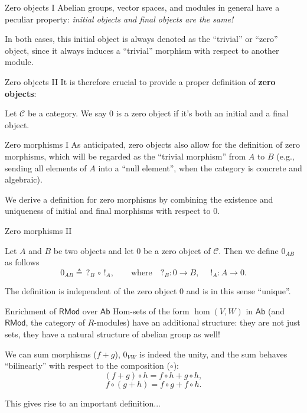 \documentclass{beamer}
\newcommand{\cat}[1]{\mathsf{#1}}
\begin{document}
\begin{frame}{Zero objects I}
    Abelian groups, vector spaces, and modules in general have a peculiar property: \textit{initial objects and
    final objects are the same!} \medskip
    
    In both cases, this initial object is always
    denoted as the ``trivial'' or ``zero'' object, since it always induces a
    ``trivial'' morphism with respect to another module.
\end{frame}

\begin{frame}{Zero objects II}
    It is therefore crucial to provide a proper definition of \textbf{zero objects}: \medskip
    
    \begin{definition}
        Let $\mathcal{C}$ be a category. We say $0$ is a
        zero object if it's both an initial and
        a final object.
    \end{definition}
\end{frame}

\begin{frame}{Zero morphisms I}
    As anticipated, zero objects also allow for the
    definition of zero morphisms, which will be regarded as the
    ``trivial morphism'' from $A$ to $B$ (e.g., sending all elements
    of $A$ into a ``null element'', when the category is concrete and
    algebraic). \medskip

    We derive a definition for zero morphisms
    by combining the existence and uniqueness of initial and final morphisms
    with respect to $0$.
\end{frame}

\begin{frame}{Zero morphisms II}
    \begin{definition}
        Let $A$ and $B$ be two objects and let $0$ be a zero
        object of $\mathcal{C}$. Then we define $0_{AB}$ as
        follows
        \[
            0_{AB} \triangleq \, ?_{B} \, \circ \, !_{A}, \qquad \text{where} \quad ?_B : 0 \to B, \quad\; !_A : A \to 0.
        \]
    \end{definition}

    The definition is independent of the zero object $0$ and is
    in this sense ``unique''.
\end{frame}

\begin{frame}{Enrichment of \texorpdfstring{$\cat{RMod}$}{RMod} over \texorpdfstring{$\cat{Ab}$}{Ab}}
    Hom-sets of the form $\hom(V, W)$ in $\cat{Ab}$ (and $\cat{RMod}$, the category
    of $R$-modules) have an additional
    structure: they are not just sets, they have a natural structure
    of abelian group as well! \medskip

    We can sum morphisms ($f + g$), $0_{VW}$ is indeed the unity,
    and the sum behaves
    ``bilinearly'' with respect to the composition ($\circ$):
    \[
        (f + g) \circ h = f \circ h + g \circ h,
    \]
    \[
        f \circ (g + h) = f \circ g + f \circ h.
    \]

    This gives rise to an important definition...
\end{frame}
\end{document}

